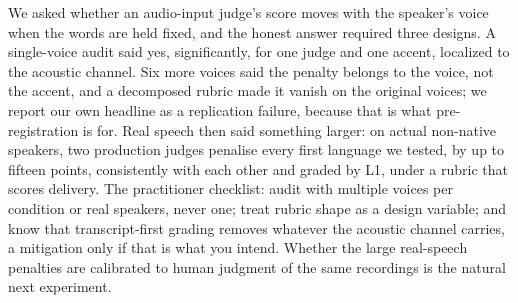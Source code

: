 We asked whether an audio-input judge's score moves with the speaker's
voice when the words are held fixed, and the honest answer required three
designs. A single-voice audit said yes, significantly, for one judge and
one accent, localized to the acoustic channel. Six more voices said the
penalty belongs to the voice, not the accent, and a decomposed rubric made
it vanish on the original voices; we report our own headline as a
replication failure, because that is what pre-registration is for. Real
speech then said something larger: on actual non-native speakers, two
production judges penalise every first language we tested, by up to fifteen
points, consistently with each other and graded by L1, under a rubric that
scores delivery. The practitioner checklist: audit with multiple voices per condition or
real speakers, never one; treat rubric shape as a design variable; and know
that transcript-first grading removes whatever the acoustic channel
carries, a mitigation only if that is what you intend. Whether the large
real-speech penalties are calibrated to human judgment of the same
recordings is the natural next experiment.

